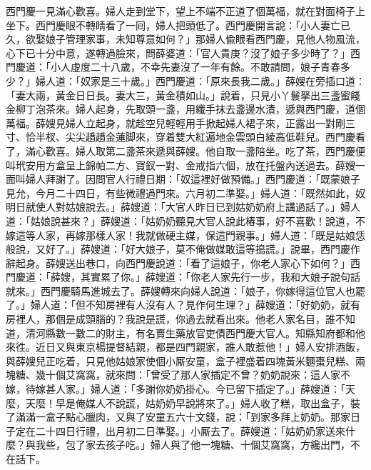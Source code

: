 西門慶一見滿心歡喜。婦人走到堂下，望上不端不正道了個萬福，就在對面椅子上坐下。西門慶眼不轉睛看了一囘，婦人把頭低了。西門慶開言說：「小人妻亡已久，欲娶娘子管理家事，未知尊意如何？」那婦人偸眼看西門慶，見他人物風流，心下已十分中意，遂轉過臉來，問薛婆道：「官人貴庚？沒了娘子多少時了？」西門慶道：「小人虛度二十八歲，不幸先妻沒了一年有餘。不敢請問，娘子青春多少？」婦人道：「奴家是三十歲。」西門慶道：「原來長我二歲。」薛嫂在旁插口道：「妻大兩，黃金日日長。妻大三，黃金積如山。」{}說着，只見小丫鬟拏出三盞蜜餞金柳丁泡茶來。婦人起身，先取頭一盞，用纖手抹去盞邊水漬，{}遞與西門慶，道個萬福。薛嫂見婦人立起身，就趁空兒{}輕輕用手掀起婦人裙子來，正露出一對剛三寸、恰半杈、尖尖趫趫金蓮脚來，{}穿着雙大紅遍地金雲頭白綾高低鞋兒。{}西門慶看了，滿心歡喜。婦人取第二盞茶來遞與薛嫂。他自取一盞陪坐。吃了茶，西門慶便叫玳安用方盒呈上錦帕二方、寶釵一對、金戒指六個，放在托盤內送過去。薛嫂一面叫婦人拜謝了。因問官人行禮日期：「奴這裡好做預備。」西門慶道：「既蒙娘子見允，今月二十四日，有些微禮過門來。六月初二準娶。」婦人道：「既然如此，奴明日就使人對姑娘說去。」薛嫂道：「大官人昨日已到姑奶奶府上講過話了。」婦人道：「姑娘說甚來？」薛嫂道：「姑奶奶聽見大官人說此樁事，好不喜歡！說道，不嫁這等人家，再嫁那樣人家！我就做硬主媒，保這門親事。」婦人道：「既是姑娘恁般說，又好了。」{}薛嫂道：「好大娘子，莫不俺做媒敢這等搗謊。」說畢，西門慶作辭起身。薛嫂送出巷口，向西門慶說道：「看了這娘子，你老人家心下如何？」西門慶道：「薛嫂，其實累了你。」{}薛嫂道：「你老人家先行一步，我和大娘子說句話就來。」西門慶騎馬進城去了。薛嫂轉來向婦人說道：「娘子，你嫁得這位官人也罷了。」婦人道：「但不知房裡有人沒有人？{}見作何生理？」薛嫂道：「好奶奶，就有房裡人，那個是成頭腦的？我說是謊，你過去就看出來。{}他老人家名目，誰不知道，清河縣數一數二的財主，有名賣生藥放官吏債西門慶大官人。知縣知府都和他來徃。近日又與東京楊提督結親，都是四門親家，誰人敢惹他！」婦人安排酒飯，與薛嫂兒正吃着，只見他姑娘家使個小厮安童，盒子裡盛着四塊黃米麵棗兒糕、兩塊糖、幾十個艾窩窩，就來問：「曾受了那人家插定不曾？奶奶說來：這人家不嫁，待嫁甚人家。」婦人道：「多謝你奶奶掛心。今已留下插定了。」薛嫂道：「天麼，天麼！早是俺媒人不說謊，姑奶奶早說將來了。」{}婦人收了糕，取出盒子，裝了滿滿一盒子點心臘肉，又與了安童五六十文錢，說：「到家多拜上奶奶。那家日子定在二十四日行禮，出月初二日準娶。」小厮去了。薛嫂道：「姑奶奶家送來什麼？與我些，包了家去孩子吃。」婦人與了他一塊糖、十個艾窩窩，方纔出門，不在話下。

